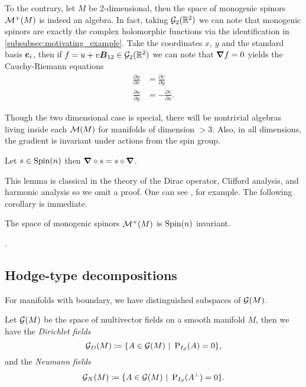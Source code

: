 To the contrary, let $M$ be 2-dimensional, then the space of monogenic spinors $\mathcal{M}^+(M)$ is indeed an algebra. In fact, taking $\mathcal{G}_2(\mathbb{R}^2)$ we can note that monogenic spinors are exactly the complex holomorphic functions via the identification in \cref{subsubsec:motivating_example}. Take the coordinates $x$, $y$ and the standard basis $\boldsymbol{e}_i$, then if $f=u+v\boldsymbol{B}_{12} \in \mathcal{G}_2(\mathbb{R}^2)$ we can note that $\boldsymbol{\nabla} f =0$ yields the Cauchy-Riemann equations
\begin{align}
\label{eq:cauchy_riemann_equations}
    \frac{\partial u}{\partial x} &= \frac{\partial v}{\partial y}\\
    \frac{\partial u}{\partial y} &= -\frac{\partial v}{\partial x}.
\end{align}

Though the two dimensional case is special, there will be nontrivial algebras living inside each $\mathcal{M}(M)$ for manifolds of dimension $>3$. Also, in all dimensions, the gradient is invariant under actions from the spin group.
\begin{lemma}
\label{lem:clifford_invariant}
Let $s\in \operatorname{Spin}(n)$ then $\boldsymbol{\nabla} \circ s = s \circ \boldsymbol{\nabla}$.
\end{lemma}
This lemma is classical in the theory of the Dirac operator, Clifford analysis, and harmonic analysis so we omit a proof.  One can see \cite{janssens_special_nodate}, for example. The following corollary is immediate.
\begin{corollary}
The space of monogenic spinors $\mathcal{M}^+(M)$ is $\operatorname{Spin}(n)$ invariant.
\end{corollary}
.



\subsection{Hodge-type decompositions}

For manifolds with boundary, we have distinguished subspaces of $\mathcal{G}(M)$. 
\begin{definition}
Let $\mathcal{G}(M)$ be the space of multivector fields on a smooth manifold $M$, then we have the \emph{Dirichlet fields}
\begin{equation}
\mathcal{G}_D(M) \coloneqq \{A \in \mathcal{G}(M) ~\vert~ \operatorname{P}_{I_{\partial}}(A) = 0 \},
\end{equation}
and the \emph{Neumann fields}
\begin{equation}
\mathcal{G}_N(M) \coloneqq \{A \in \mathcal{G}(M) ~\vert~ \operatorname{P}_{I_{\partial}}(A^\perp) = 0 \}.
\end{equation}
\end{definition}

